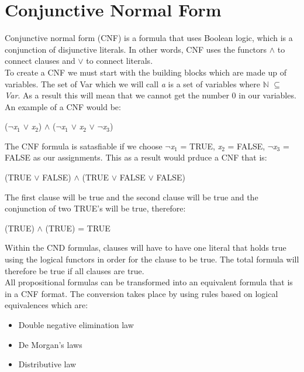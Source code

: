 \documentclass[11pt,a4paper]{report}
\begin{document}
\section{Conjunctive Normal Form}
Conjunctive normal form (CNF) is a formula that uses Boolean logic, which is a conjunction of disjunctive literals. In other words, CNF uses the functors $\land$ to connect clauses and $\lor$ to connect literals. \\
To create a CNF we must start with the building blocks which are made up of variables. The set of Var which we will call \textit{a} is a set of variables where $\mathbb{N}$ $\subseteq$ \textit{Var}. As a result this will mean that we cannot get the number 0 in our variables.\\
An example of a CNF would be:

\begin{center}
($\neg$\textit{x}$_1$ $\lor$ \textit{x}$_2$) $\land$ ($\neg$\textit{x}$_1$ $\lor$ \textit{x}$_2$ $\lor$ $\neg$\textit{x}$_3$)
\end{center}
The CNF formula is satasfiable if we choose $\neg$\textit{x}$_1$ = TRUE, \textit{x}$_2$ = FALSE, $\neg$\textit{x}$_3$ = FALSE as our assignments. This as a result would prduce a CNF that is: 

\begin{center}
(TRUE $\lor$ FALSE) $\land$ (TRUE $\lor$ FALSE $\lor$ FALSE) 
\end{center}
The first clause will be true and the second clause will be true and the conjunction of two TRUE's will be true, therefore: 

\begin{center}
(TRUE) $\land$ (TRUE) = TRUE
\end{center}
Within the CND formulas, clauses will have to have one literal that holds true using the logical functors in order for the clause to be true. The total formula will therefore be true if all clauses are true. \\
All propositional formulas can be transformed into an equivalent formula that is in a CNF format. The conversion takes place by using rules based on logical equivalences which are:

\begin{itemize}
\item Double negative elimination law
\item De Morgan's laws
\item Distributive law
\end{itemize}
\end{document}
